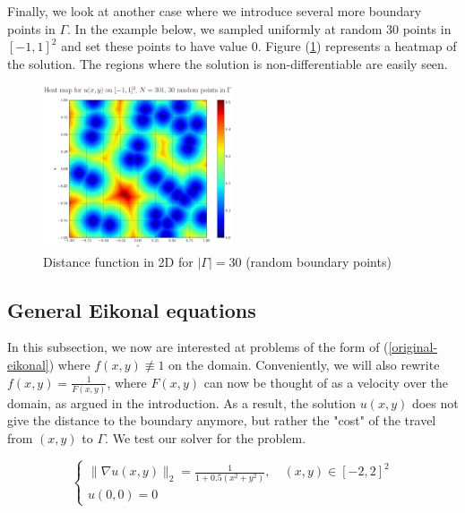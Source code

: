\documentclass[11pt]{article}
\theoremstyle{definition}
\theoremstyle{remark}
\begin{document}
\FloatBarrier

\noindent Finally, we look at another case where we introduce several more boundary points in $\Gamma$. In the example below, we sampled uniformly at random 30 points in $[-1,1]^2$ and set these points to have value 0. Figure (\ref{fig:heatmap30random}) represents a heatmap of the solution. The regions where the solution is non-differentiable are easily seen.

\begin{figure}[h!]
  \centering
  \includegraphics[width=0.5\textwidth]{plots/heatmap_random30.png}
  \caption{Distance function in 2D for $|\Gamma|=30$ (random boundary points)}
  \label{fig:heatmap30random}
\end{figure}

\newpage

\subsection{General Eikonal equations}
In this subsection, we now are interested at problems of the form of (\ref{original-eikonal}) where $f(x,y)\not\equiv 1$ on the domain. Conveniently, we will also rewrite $f(x,y)=\frac{1}{F(x,y)}$, where $F(x,y)$ can now be thought of as a velocity over the domain, as argued in the introduction. As a result, the solution $u(x,y)$ does not give the distance to the boundary anymore, but rather the "cost" of the travel from $(x,y)$ to $\Gamma$.
We test our solver for the problem.

\begin{equation}
\label{arctan_equation}
    \begin{cases}
        \|\nabla u(x,y)\|_2=\frac{1}{1+0.5(x^2+y^2)} , \quad(x,y) \in [-2,2]^2 \\
        u(0,0)= 0
    \end{cases}
\end{equation} \\
\end{document}
